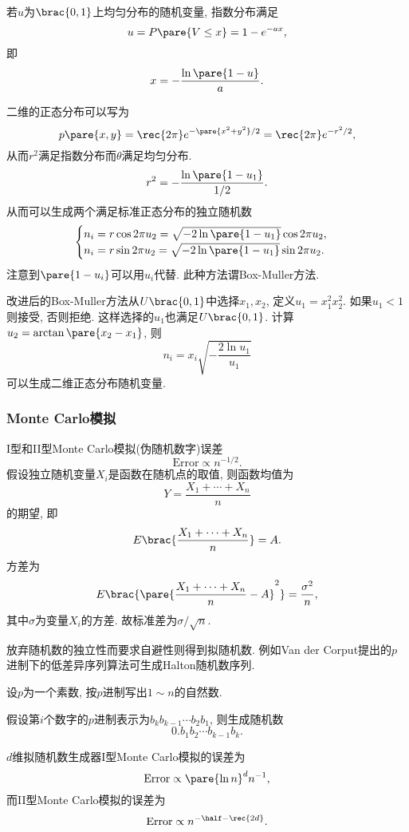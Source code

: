 \documentclass{ctexart}
\begin{document}
若$u$为$\brac{0,1}$上均匀分布的随机变量, 指数分布满足
\[ u = P\pare{V \le x} = 1-e^{-ax}, \]
即
\[ x = -\frac{\ln\pare{1-u}}{a}. \]
\par
二维的正态分布可以写为
\[ p\pare{x,y} = \rec{2\pi} e^{-\pare{x^2+y^2}/2} = \rec{2\pi}e^{-r^2/2}, \]
从而$r^2$满足指数分布而$\theta$满足均匀分布.
\[ r^2 = -\frac{\ln \pare{1-u_1}}{1/2}. \]
从而可以生成两个满足标准正态分布的独立随机数
\[ \begin{cases}
    n_i = r\cos 2\pi u_2 = \sqrt{-2\ln\pare{1-u_1}}\cos 2\pi u_2,\\
    n_i = r\sin 2\pi u_2 = \sqrt{-2\ln\pare{1-u_1}}\sin 2\pi u_2.
\end{cases} \]
注意到$\pare{1-u_i}$可以用$u_i$代替. 此种方法谓Box-Muller方法.
\par
改进后的Box-Muller方法从$U\brac{0,1}$中选择$x_1, x_2$, 定义$u_1 = x_1^2  x_2^2$. 如果$u_1 < 1$则接受, 否则拒绝. 这样选择的$u_1$也满足$U\brac{0,1}$. 计算$u_2 = \arctan \pare{x_2 - x_1}$, 则
\[ n_i = x_i \sqrt{-\frac{2\ln u_1}{u_1}} \]
可以生成二维正态分布随机变量.


\subsubsection{Monte Carlo模拟} %
\label{ssub:monte_carlo模拟}

I型和II型Monte Carlo模拟(伪随机数字)误差
\[ \mathrm{Error} \propto n^{-1/2}. \]
假设独立随机变量$X_i$是函数在随机点的取值, 则函数均值为
\[ Y = \frac{X_1 + \cdots + X_n}{n} \]
的期望, 即
\[ E\brac{\frac{X_1 + \cdots + X_n}{n}} = A. \]
方差为
\[ E\brac{\pare{\frac{X_1 + \cdots + X_n}{n} - A}^2} = \frac{\sigma^2}{n}, \]
其中$\sigma$为变量$X_i$的方差. 故标准差为$\sigma/\sqrt{n}$.

\par
放弃随机数的独立性而要求自避性则得到拟随机数. 例如Van der Corput提出的$p$进制下的低差异序列算法可生成Halton随机数序列.
\begin{cenum}
    \item 设$p$为一个素数, 按$p$进制写出$1\sim n$的自然数.
    \item 假设第$i$个数字的$p$进制表示为$b_kb_{k-1}\cdots b_2b_1$, 则生成随机数
    \[ 0.b_1b_2\cdots b_{k-1}b_k. \]
\end{cenum}
$d$维拟随机数生成器I型Monte Carlo模拟的误差为
\[ \mathrm{Error} \propto \pare{\ln n}^d n^{-1}, \]
而II型Monte Carlo模拟的误差为
\[ \mathrm{Error} \propto n^{-\half - \rec{2d}}. \]
\end{document}
